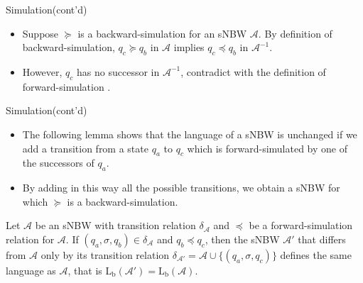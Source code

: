 \documentclass[12pt]{beamer}
\begin{document}
\begin{frame}{Simulation(cont'd)}
	\begin{itemize}
		\item Suppose $\succeq$ is a backward-simulation for an sNBW $\mathcal{A}$. By definition of backward-simulation, $q_{c} \succeq q_{b}$ in $\mathcal{A}$ implies $q_{c} \preceq q_{b}$ in $\mathcal{A}^{-1}$.
		\item However, $q_{c}$ has no successor in $\mathcal{A}^{-1}$, contradict with the definition of forward-simulation . 
	\end{itemize}
\end{frame}

\begin{frame}{Simulation(cont'd)}
	\label{lemma}
	\begin{itemize}
		\item The following lemma shows that the language of a sNBW is unchanged if we add a transition from a state $q_{a}$ to $q_{c}$ which is forward-simulated by one of the successors of $q_{a}$.
		\item By adding in this way all the possible transitions, we
		obtain a sNBW for which $\succeq$ is a backward-simulation.
	\end{itemize}
	\begin{lemma}
		Let $\mathcal{A}$ be an sNBW with transition relation $\delta_{\mathcal{A}}$ and $\preceq$ be a forward-simulation relation for $\mathcal{A}$. If $(q_{a}, \sigma, q_{b}) \in \delta_{\mathcal{A}}$ and $q_{b} \preceq q_{c}$, then the sNBW $\mathcal{A}'$ that differs from $\mathcal{A}$ only by its transition relation $\delta_{\mathcal{A}'} = \mathcal{A} \cup \{(q_{a}, \sigma, q_{c})\}$ defines the same language as $\mathcal{A}$, that is $\text{L}_\text{b}(\mathcal{A}') = \text{L}_\text{b}(\mathcal{A})$.
	\end{lemma}
\end{frame}
\end{document}
